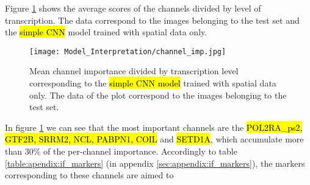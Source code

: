 Figure \ref{fig:results:model_int:channel_imp} shows the average scores of the channels divided by level of transcription. The data correspond to the images belonging to the test set and the \hl{simple CNN} model trained with spatial data only.

\begin{figure}[htb]
  \centering
  \texttt{[image: Model\_Interpretation/channel\_imp.jpg]}
  \caption{Mean channel importance divided by transcription level corresponding to the \hl{simple CNN model} trained with spatial data only. The data of the plot correspond to the images belonging to the test set.}
  \label{fig:results:model_int:channel_imp}
\end{figure}

In figure \ref{fig:results:model_int:channel_imp} we can see that the most important channels are the \hl{POL2RA\_ps2, GTF2B, SRRM2, NCL, PABPN1, COIL} and \hl{SETD1A}, which accumulate more than $30\%$ of the per-channel importance.
Accordingly to table \ref{table:apendix:if_markers} (in appendix \ref{sec:appendix:if_markers}), the markers corresponding to these channels are aimed to

